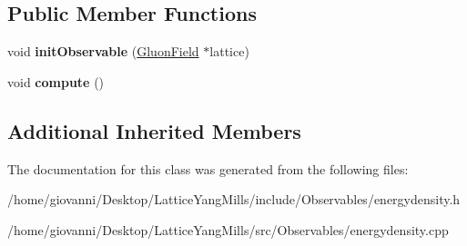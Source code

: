 \subsection*{Public Member Functions}
\begin{DoxyCompactItemize}
\item 
void {\bfseries init\+Observable} (\hyperlink{classField}{Gluon\+Field} $\ast$lattice)\hypertarget{classEnergyDensity_ad076c85838b7d1e4d795655818369409}{}\label{classEnergyDensity_ad076c85838b7d1e4d795655818369409}

\item 
void {\bfseries compute} ()\hypertarget{classEnergyDensity_a8719af212e9534be4f23244c0ea85019}{}\label{classEnergyDensity_a8719af212e9534be4f23244c0ea85019}

\end{DoxyCompactItemize}
\subsection*{Additional Inherited Members}


The documentation for this class was generated from the following files\+:\begin{DoxyCompactItemize}
\item 
/home/giovanni/\+Desktop/\+Lattice\+Yang\+Mills/include/\+Observables/energydensity.\+h\item 
/home/giovanni/\+Desktop/\+Lattice\+Yang\+Mills/src/\+Observables/energydensity.\+cpp\end{DoxyCompactItemize}
